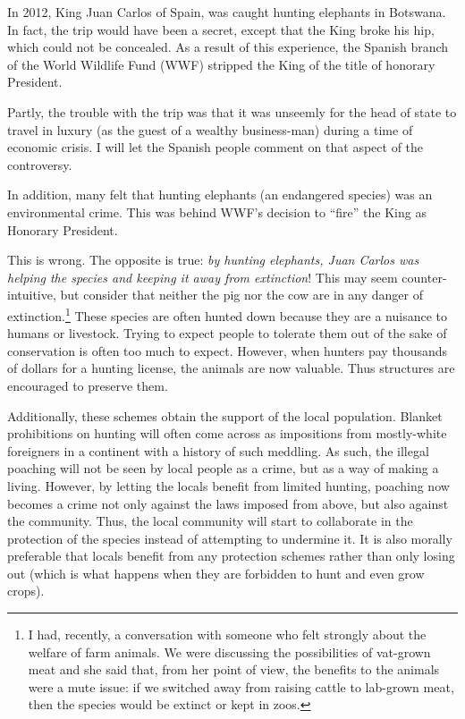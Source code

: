 In 2012, King Juan Carlos of Spain, was caught hunting elephants in Botswana.
In fact, the trip would have been a secret, except that the King broke his hip,
which could not be concealed. As a result of this experience, the Spanish
branch of the World Wildlife Fund (WWF) stripped the King of the title of
honorary President.

Partly, the trouble with the trip was that it was unseemly for the head of
state to travel in luxury (as the guest of a wealthy business-man) during a
time of economic crisis. I will let the Spanish people comment on that aspect
of the controversy.

In addition, many felt that hunting elephants (an endangered species) was an
environmental crime. This was behind WWF's decision to ``fire'' the King as
Honorary President.

This is wrong. The opposite is true: \emph{by hunting elephants, Juan Carlos
was helping the species and keeping it away from extinction}! This may seem
counter-intuitive, but consider that neither the pig nor the cow are in any
danger of extinction.\footnote{I had, recently, a conversation with someone who
felt strongly about the welfare of farm animals. We were discussing the
possibilities of vat-grown meat and she said that, from her point of view, the
benefits to the animals were a mute issue: if we switched away from raising
cattle to lab-grown meat, then the species would be extinct or kept in zoos.}
These species are often hunted down because they are a nuisance to humans or
livestock. Trying to expect people to tolerate them out of the sake of
conservation is often too much to expect. However, when hunters pay thousands
of dollars for a hunting license, the animals are now valuable. Thus structures
are encouraged to preserve them.

Additionally, these schemes obtain the support of the local population. Blanket
prohibitions on hunting will often come across as impositions from mostly-white
foreigners in a continent with a history of such meddling. As such, the illegal
poaching will not be seen by local people as a crime, but as a way of making a
living. However, by letting the locals benefit from limited hunting, poaching
now becomes a crime not only against the laws imposed from above, but also
against the community. Thus, the local community will start to collaborate in
the protection of the species instead of attempting to undermine it. It is also
morally preferable that locals benefit from any protection schemes rather than
only losing out (which is what happens when they are forbidden to hunt and even
grow crops).

